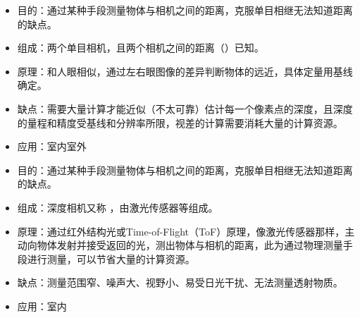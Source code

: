 \nob[2] 
\begin{itemize}[itemsep=0.1pt,topsep =2pt]
    \item 目的：通过某种手段测量物体与相机之间的距离，克服单目相继无法知道距离的缺点。
    \item 组成：两个单目相机，且两个相机之间的距离（）已知。
    \item 原理：和人眼相似，通过左右眼图像的差异判断物体的远近，具体定量用基线确定。
    \item 缺点：需要大量计算才能近似（不太可靠）估计每一个像素点的深度，且深度的量程和精度受基线和分辨率所限，视差的计算需要消耗大量的计算资源。
    \item 应用：室内室外
\end{itemize}

\vspace*{0.5em}

\nob[3] 
\begin{itemize}[itemsep=0.1pt,topsep =2pt]
    \item 目的：通过某种手段测量物体与相机之间的距离，克服单目相继无法知道距离的缺点。
    \item 组成：深度相机又称 ，由激光传感器等组成。
    \item 原理：通过红外结构光或Time-of-Flight（ToF）原理，像激光传感器那样，主动向物体发射并接受返回的光，测出物体与相机的距离，此为通过物理测量手段进行测量，可以节省大量的计算资源。
    \item 缺点：测量范围窄、噪声大、视野小、易受日光干扰、无法测量透射物质。
    \item 应用：室内
\end{itemize}

